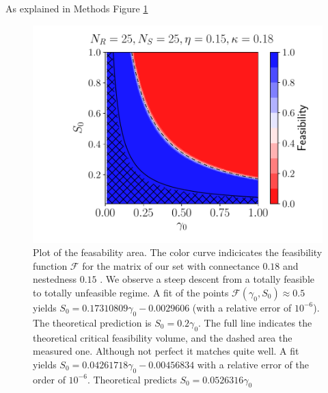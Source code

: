 \documentclass[12pt, titlepage]{report}
\begin{document}
As explained in Methods
Figure \ref{fig : feasability region}
\begin{figure}[h!]
\centering
\includegraphics{Results/typical_feasibility_volume}
\caption{Plot of the feasability area. The color curve indicicates the feasibility function $\mathcal{F}$ for the matrix of our set with connectance $0.18$ and nestedness $0.15$ . We observe a steep descent from a totally feasible to totally unfeasible regime. A fit of the points $\mathcal{F}(\gamma_0, S_0) \approx 0.5 $ yields $S_0 = 0.17310809 \gamma_0 -0.0029606$
(with a relative error of $10^{-6}$). The theoretical prediction is $S_0 = 0.2 \gamma_0$. The full line indicates the theoretical critical feasibility volume, and the dashed area the measured one. Although not perfect it matches quite well. A fit yields $S_0 = 0.04261718 \gamma_0 -0.00456834$ with a relative error of the order of $10^{-6}$. Theoretical predicts $S_0=0.0526316 \gamma_0$}
\label{fig : feasability region}
\end{figure}
\end{document}
